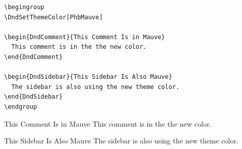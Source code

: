 \documentclass[10pt,twoside,twocolumn,openany,nodepracetedcode]{dndbook}
\begin{document}
\begin{lstlisting}
\begingroup
\DndSetThemeColor[PhbMauve]

\begin{DndComment}{This Comment Is in Mauve}
  This comment is in the the new color.
\end{DndComment}

\begin{DndSidebar}{This Sidebar Is Also Mauve}
  The sidebar is also using the new theme color.
\end{DndSidebar}
\endgroup
\end{lstlisting}

\begingroup
\DndSetThemeColor[PhbMauve]

\begin{DndComment}{This Comment Is in Mauve}
  This comment is in the the new color.
\end{DndComment}

\begin{DndSidebar}{This Sidebar Is Also Mauve}
  The sidebar is also using the new theme color.
\end{DndSidebar}
\endgroup
\end{document}
